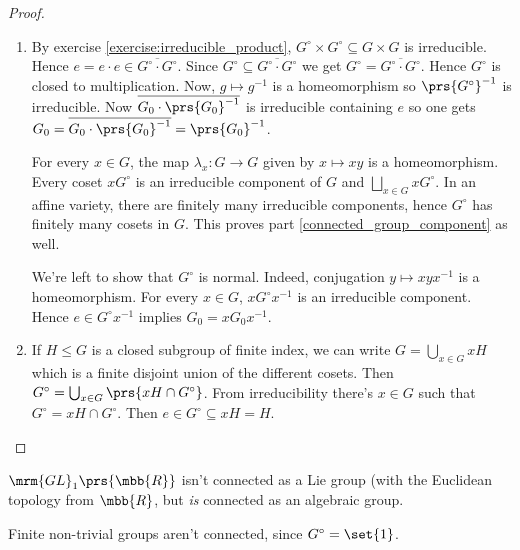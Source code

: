 \documentclass[10pt,a4paper,twoside,openany,hidelinks]{book}
\begin{document}
\begin{proof}
\begin{enumerate}
\item By exercise \ref{exercise:irreducible_product}, $G^\circ \times G^\circ \subseteq G \times G$ is irreducible. Hence $e = e \cdot e \in \overline{G^\circ \cdot G^\circ}$. Since $G^\circ \subseteq \overline{G^\circ \cdot G^\circ}$ we get $G^\circ = \overline{G^\circ \cdot G^\circ}$. Hence $G^\circ$ is closed to multiplication.
Now, $g \mapsto g^{-1}$ is a homeomorphism so $\prs{G^\circ}^{-1}$ is irreducible.
Now $\overline{G_0 \cdot \prs{G_0}^{-1}}$ is irreducible containing $e$ so one gets $G_0 = \overline{G_0 \cdot \prs{G_0}^{-1}} = \prs{G_0}^{-1}$.

For every $x \in G$, the map $\lambda_x \colon G \to G$ given by $x \mapsto xy$ is a homeomorphism. Every coset $xG^\circ$ is an irreducible component of $G$ and $\bigsqcup_{x \in G} x G^\circ$. In an affine variety, there are finitely many irreducible components, hence $G^\circ$ has finitely many cosets in $G$. This proves part \ref{connected_group_component} as well.

We're left to show that $G^\circ$ is normal.
Indeed, conjugation $y \mapsto xyx^{-1}$ is a homeomorphism. For every $x \in G$, $x G^\circ x^{-1}$ is an irreducible component. Hence $e \in G^\circ x^{-1}$ implies $G_0 = x G_0 x^{-1}$.

\item
If $H \leq G$ is a closed subgroup of finite index, we can write $G = \bigcup_{x \in G} xH$ which is a finite disjoint union of the different cosets.
Then
$G^\circ = \bigcup_{x \in G} \prs{xH \cap G^\circ}$.
From irreducibility there's $x \in G$ such that $G^\circ = xH \cap G^\circ$. Then $e \in G^\circ \subseteq xH = H$.
\end{enumerate}
\end{proof}


\begin{example}
$\mrm{GL}_1\prs{\mbb{R}}$ isn't connected as a Lie group (with the Euclidean topology from $\mbb{R}$, but \emph{is} connected as an algebraic group.
\end{example}

\begin{example}
Finite non-trivial groups aren't connected, since $G^\circ = \set{1}$.
\end{example}
\end{document}
